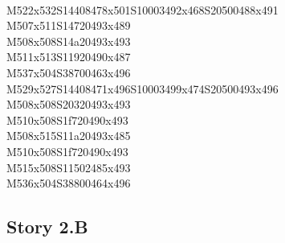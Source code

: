 \documentclass{article}
\begin{document}
\begin{multicols}{5}
\begin{center}
\\M522x532S14408478x501S10003492x468S20500488x491 %
\\M507x511S14720493x489 %
\\M508x508S14a20493x493 %
\\M511x513S11920490x487 %
\\M537x504S38700463x496 %
\\M529x527S14408471x496S10003499x474S20500493x496 %
\\M508x508S20320493x493 %
\\M510x508S1f720490x493 %
\\M508x515S11a20493x485 %
\\M510x508S1f720490x493 %
\\M515x508S11502485x493 %
\\M536x504S38800464x496 %
\end{center}
\end{multicols}

\subsection{Story 2.B}
\end{document}
